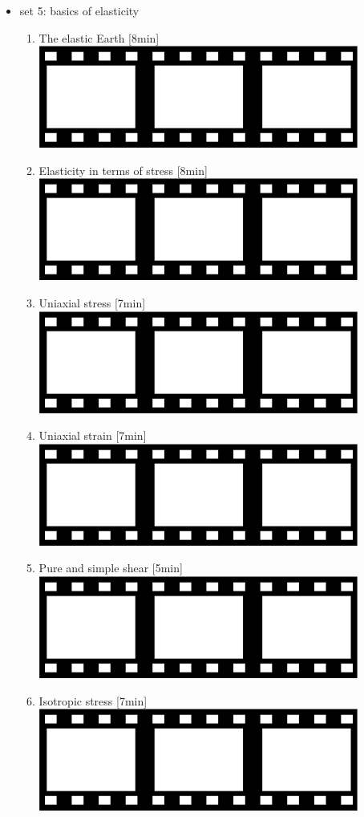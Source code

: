 \begin{itemize}
\item set 5: basics of elasticity
\begin{enumerate}
\item The elastic Earth [8min] \href{https://youtu.be/c7Hptg9HkfM?si=lCtnBYua3l_WGIxw}{\includegraphics[width=.8cm]{images/pictograms/film.png}}
\item Elasticity in terms of stress [8min] \href{https://youtu.be/D3AaqkI8-nk?si=2lEtTkTsV6hzjSch}{\includegraphics[width=.8cm]{images/pictograms/film.png}}
\item Uniaxial stress [7min] \href{https://youtu.be/ftjmREEUk8M?si=d_wCZW_evAytItvC}{\includegraphics[width=.8cm]{images/pictograms/film.png}}
\item Uniaxial strain [7min] \href{https://youtu.be/C0QiZC6yfL4?si=xpONTnK2MrOPE5Pp}{\includegraphics[width=.8cm]{images/pictograms/film.png}}
\item Pure and simple shear [5min] \href{https://youtu.be/srgMoMoHU1A?si=CGAfFLYEZfcC0IBB}{\includegraphics[width=.8cm]{images/pictograms/film.png}}
\item Isotropic stress [7min] \href{https://youtu.be/niP-lcSGh3g?si=diA1DxGyOqRDrTla}{\includegraphics[width=.8cm]{images/pictograms/film.png}}
\end{enumerate}



\end{itemize}

